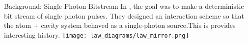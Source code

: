 \begin{frame}{Background: Single Photon Bitstream}
    In \citep{Law1997}, the goal was to make a deterministic bit stream of single photon pulses. They designed an interaction scheme so that the atom + cavity system behaved as a single-photon source.This is provides interesting history.
    \texttt{[image: law\_diagrams/law\_mirror.png]}
\end{frame}


